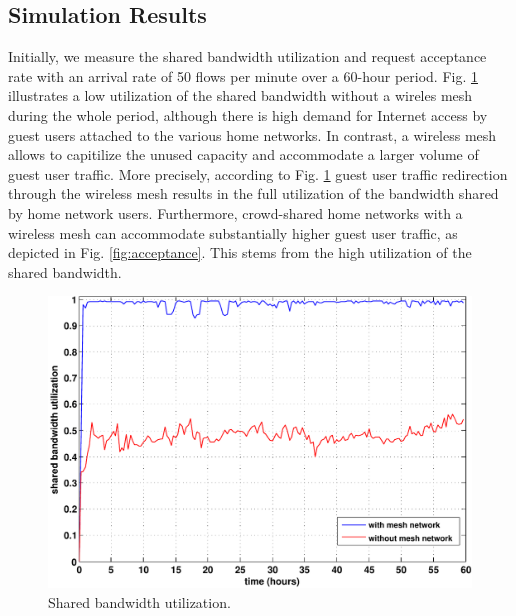 \subsection{Simulation Results}
\label{evaluation:results}

Initially, we measure the shared bandwidth utilization and request acceptance rate with an arrival rate of 50 flows per minute over a 60-hour period. Fig. \ref{fig:utilization} illustrates a low utilization of the shared bandwidth without a wireles mesh during the whole period, although there is high demand for Internet access by guest users attached to the various home networks. In contrast, a wireless mesh allows to capitilize the unused capacity and accommodate a larger volume of guest user traffic. More precisely, according to Fig. \ref{fig:utilization} guest user traffic redirection through the wireless mesh results in the full utilization of the bandwidth shared by home network users. Furthermore, crowd-shared home networks with a wireless mesh can accommodate substantially higher guest user traffic, as depicted in Fig. \ref{fig:acceptance}. This stems from the high utilization of the shared bandwidth.

\begin{figure}[t]
\begin{center}
\includegraphics[width=1\linewidth]{results/utilization.pdf}
\caption{Shared bandwidth utilization.}
\label{fig:utilization}
\end{center}
\end{figure}

